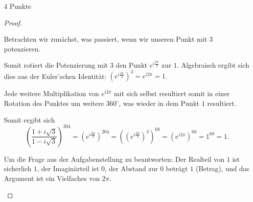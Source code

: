 \documentclass{problemset}
\begin{document}
\begin{problem}{4 Punkte}
\begin{proof}
\begin{enumerate}
              Betrachten wir zunächst, was passiert, wenn wir unseren Punkt mit $3$
              potenzieren.

              \begin{center}
              \end{center}

              Somit rotiert die Potenzierung mit $3$ den Punkt $e^{i\frac{2 \pi }{3}}$ zur
              $1$. Algebraisch ergibt sich dies aus der Euler'schen Identität: $({e^{i\frac{2
                                      \pi }{3}}})^3 = e^{i2\pi} = 1$.

              Jede weitere Multiplikation von $e^{i2\pi}$ mit sich selbst resultiert somit in
              einer Rotation des Punktes um weitere $360^\circ$, was wieder in dem Punkt $1$
              resultiert.

              Somit ergibt sich
              \[
                  {\left(\frac{1+i\sqrt{3}}{1-i\sqrt{3}}\right)}^{204}
                  = {(e^{i\frac{2 \pi }{3}} )}^{204}
                      = {({(e^{i\frac{2 \pi }{3}} )}^3)}^{68}
                      = {(e^{i2\pi})}^{68}
                      = 1^{68}
                  = 1.
              \]

              Um die Frage aus der Aufgabenstellung zu beantworten: Der Realteil von $1$ ist
              sicherlich $1$, der Imaginärteil ist $0$, der Abstand zur $0$ beträgt $1$
              (Betrag), und das Argument ist ein Vielfaches von $2\pi$.


\end{enumerate}
\end{proof}
\end{problem}
\end{document}
